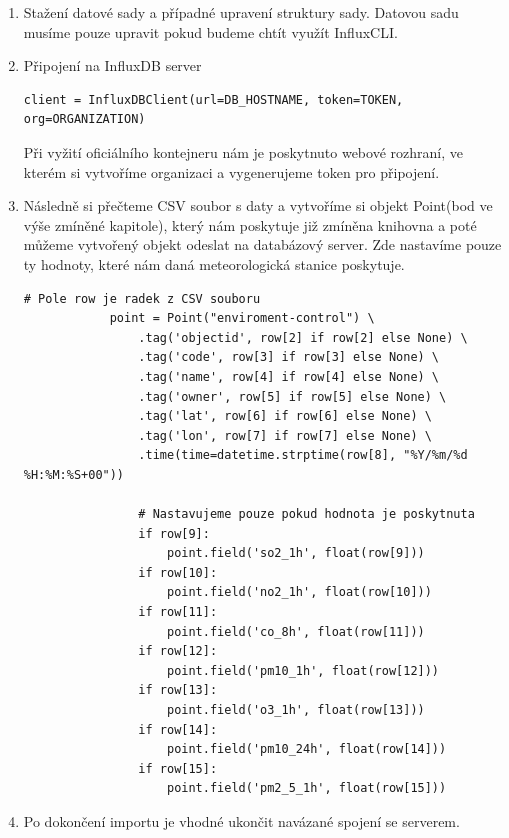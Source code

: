 \documentclass[a4paper, 11pt]{article}
\begin{document}
         \begin{enumerate}
            \item Stažení datové sady a případné upravení struktury sady. Datovou sadu musíme pouze upravit pokud budeme chtít využít InfluxCLI.
            \item Připojení na InfluxDB server
                \begin{lstlisting}[style=Python]
            client = InfluxDBClient(url=DB_HOSTNAME, token=TOKEN, org=ORGANIZATION)
                \end{lstlisting}
                Při vyžití oficiálního kontejneru nám je poskytnuto webové rozhraní, ve kterém si vytvoříme organizaci a vygenerujeme token pro připojení.
            \item Následně si přečteme CSV soubor s daty a vytvoříme si objekt Point(bod ve výše zmíněné kapitole), který nám poskytuje již zmíněna knihovna a poté můžeme vytvořený objekt odeslat na databázový server. Zde nastavíme pouze ty hodnoty, které nám daná meteorologická stanice poskytuje.
            \begin{lstlisting}[style=Python]
            # Pole row je radek z CSV souboru
            point = Point("enviroment-control") \
                .tag('objectid', row[2] if row[2] else None) \
                .tag('code', row[3] if row[3] else None) \
                .tag('name', row[4] if row[4] else None) \
                .tag('owner', row[5] if row[5] else None) \
                .tag('lat', row[6] if row[6] else None) \
                .tag('lon', row[7] if row[7] else None) \
                .time(time=datetime.strptime(row[8], "%Y/%m/%d %H:%M:%S+00"))
            
                # Nastavujeme pouze pokud hodnota je poskytnuta
                if row[9]:
                    point.field('so2_1h', float(row[9]))
                if row[10]:
                    point.field('no2_1h', float(row[10]))
                if row[11]:
                    point.field('co_8h', float(row[11]))
                if row[12]:
                    point.field('pm10_1h', float(row[12]))
                if row[13]:
                    point.field('o3_1h', float(row[13]))
                if row[14]:
                    point.field('pm10_24h', float(row[14]))
                if row[15]:
                    point.field('pm2_5_1h', float(row[15])) 
                \end{lstlisting}
            \item Po dokončení importu je vhodné ukončit navázané spojení se serverem.
        \end{enumerate}
\end{document}
